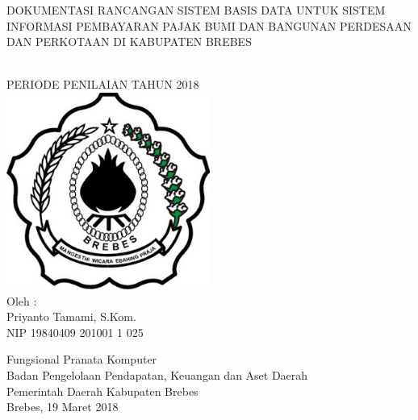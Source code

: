 \begin{titlepage}

\begin{center}
{\large DOKUMENTASI RANCANGAN SISTEM BASIS DATA UNTUK SISTEM INFORMASI PEMBAYARAN PAJAK BUMI DAN BANGUNAN PERDESAAN DAN PERKOTAAN DI KABUPATEN BREBES}

\HRule\\[1cm]

PERIODE PENILAIAN TAHUN 2018\\[1cm]

\includegraphics[width=0.5\textwidth]{./resources/logo}\\[1cm]

Oleh :\\
Priyanto Tamami, S.Kom.\\
NIP 19840409 201001 1 025\\


\vfill


Fungsional Pranata Komputer\\
Badan Pengelolaan Pendapatan, Keuangan dan Aset Daerah\\
Pemerintah Daerah Kabupaten Brebes\\
Brebes, 19 Maret 2018
\end{center}

\end{titlepage}